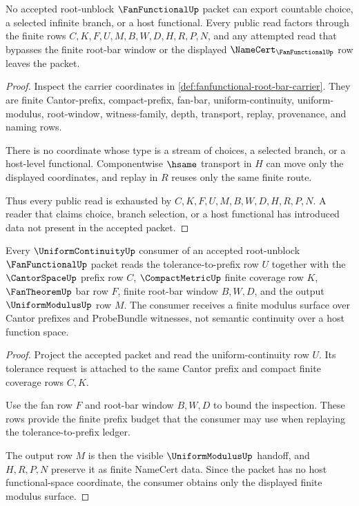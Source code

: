 \begin{theorem}
\label{thm:fanfunctional-root-choice-free-nonescape}
No accepted root-unblock $\FanFunctionalUp$ packet can export countable choice, a selected infinite branch, or a host functional. Every public read factors through the finite rows $C,K,F,U,M,B,W,D,H,R,P,N$, and any attempted read that bypasses the finite root-bar window or the displayed $\NameCert_{\FanFunctionalUp}$ row leaves the packet.
\end{theorem}
\begin{proof}
Inspect the carrier coordinates in \autoref{def:fanfunctional-root-bar-carrier}. They are finite Cantor-prefix, compact-prefix, fan-bar, uniform-continuity, uniform-modulus, root-window, witness-family, depth, transport, replay, provenance, and naming rows.

There is no coordinate whose type is a stream of choices, a selected branch, or a host-level functional. Componentwise $\hsame$ transport in $H$ can move only the displayed coordinates, and replay in $R$ reuses only the same finite route.

Thus every public read is exhausted by $C,K,F,U,M,B,W,D,H,R,P,N$. A reader that claims choice, branch selection, or a host functional has introduced data not present in the accepted packet.
\end{proof}

\begin{theorem}
\label{thm:fanfunctional-root-uniformcontinuity-consumer}
Every $\UniformContinuityUp$ consumer of an accepted root-unblock $\FanFunctionalUp$ packet reads the tolerance-to-prefix row $U$ together with the $\CantorSpaceUp$ prefix row $C$, $\CompactMetricUp$ finite coverage row $K$, $\FanTheoremUp$ bar row $F$, finite root-bar window $B,W,D$, and the output $\UniformModulusUp$ row $M$. The consumer receives a finite modulus surface over Cantor prefixes and ProbeBundle witnesses, not semantic continuity over a host function space.
\end{theorem}
\begin{proof}
Project the accepted packet and read the uniform-continuity row $U$. Its tolerance request is attached to the same Cantor prefix and compact finite coverage rows $C,K$.

Use the fan row $F$ and root-bar window $B,W,D$ to bound the inspection. These rows provide the finite prefix budget that the consumer may use when replaying the tolerance-to-prefix ledger.

The output row $M$ is then the visible $\UniformModulusUp$ handoff, and $H,R,P,N$ preserve it as finite NameCert data. Since the packet has no host functional-space coordinate, the consumer obtains only the displayed finite modulus surface.
\end{proof}

